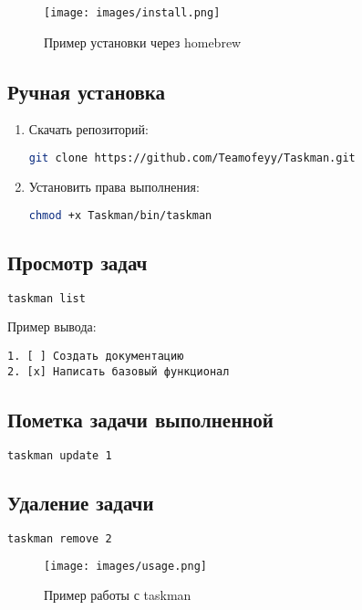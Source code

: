 \documentclass[a4paper,12pt]{article}
\begin{document}
\begin{figure}[h]
  \centering
  \texttt{[image: images/install.png]}
  \caption{Пример установки через homebrew}
  \label{fig:install}
  \end{figure}

\subsection{Ручная установка}
\begin{enumerate}
\item Скачать репозиторий:
\begin{lstlisting}[language=bash]
git clone https://github.com/Teamofeyy/Taskman.git
\end{lstlisting}

\item Установить права выполнения:
\begin{lstlisting}[language=bash]
chmod +x Taskman/bin/taskman
\end{lstlisting}
\end{enumerate}



\subsection{Просмотр задач}
\begin{lstlisting}[language=bash]
taskman list
\end{lstlisting}
Пример вывода:
\begin{verbatim}
1. [ ] Создать документацию
2. [x] Написать базовый функционал
\end{verbatim}

\subsection{Пометка задачи выполненной}
\begin{lstlisting}[language=bash]
taskman update 1
\end{lstlisting}

\subsection{Удаление задачи}
\begin{lstlisting}[language=bash]
taskman remove 2
\end{lstlisting}

\begin{figure}[h]
  \centering
  \texttt{[image: images/usage.png]}
  \caption{Пример работы с taskman}
  \label{fig:usage}
  \end{figure}
\end{document}
